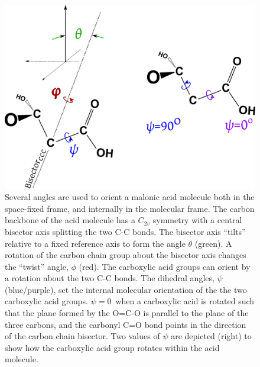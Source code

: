 \begin{figure}[h!]
	\begin{center}
		\includegraphics[scale=1.0]{images/malonic-angles/malonic-angles.png}
		\caption{Several angles are used to orient a malonic acid molecule both in the space-fixed frame, and internally in the molecular frame. The carbon backbone of the acid molecule has a $C_{2v}$ symmetry with a central bisector axis splitting the two C-C bonds. The bisector axis ``tilts'' relative to a fixed reference axis to form the angle $\theta$ (green). A rotation of the carbon chain group about the bisector axis changes the ``twist'' angle, $\phi$ (red). The carboxylic acid groups can orient by a rotation about the two C-C bonds. The dihedral angles, $\psi$ (blue/purple), set the internal molecular orientation of the the two carboxylic acid groups. $\psi=0$\textdegree~when a carboxylic acid is rotated such that the plane formed by the O=C-O is parallel to the plane of the three carbons, and the carbonyl C=O bond points in the direction of the carbon chain bisector. Two values of $\psi$ are depicted (right) to show how the carboxylic acid group rotates within the acid molecule.}
		\label{fig:angle-definitions}
	\end{center}
\end{figure}

